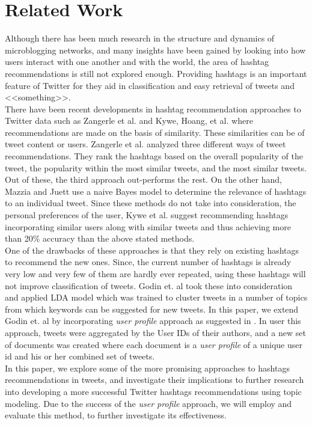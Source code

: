 \documentclass{acm_proc_article-sp}
\begin{document}
\section{Related Work}
\hspace*{5mm}Although there has been much research in the structure and dynamics of microblogging networks, and many insights have been gained by looking into how users interact with one another and with the world, the area of hashtag recommendations is still not explored enough. Providing hashtags is an important feature of Twitter for they aid in classification and easy retrieval of tweets and <<something>>.\\
\hspace*{5mm}There have been recent developments in hashtag recommendation approaches to Twitter data such as Zangerle et al. \cite{zangerle2011recommending} and Kywe, Hoang, et al.\cite{kywe2012recommending} where recommendations are made on the basis of similarity. These similarities can be of tweet content or users. Zangerle et al. \cite{zangerle2011recommending} analyzed three different ways of tweet recommendations. They rank the hashtags based on the overall popularity of the tweet, the popularity within the most similar tweets, and the most similar tweets. Out of these, the third approach out-performs the rest. On the other hand, Mazzia and Juett \cite{mazzia2009suggesting} use a naive Bayes model to determine the relevance of hashtags to an individual tweet. Since these methods do not take into consideration, the personal preferences of the user, Kywe et al. \cite{kywe2012recommending} suggest recommending hashtags incorporating similar users along with similar tweets and thus achieving more than 20\% accuracy than the above stated methods.\\
\hspace*{5mm}One of the drawbacks of these approaches is that they rely on existing hashtags to recommend the new ones. Since, the current number of hashtags is already very low and very few of them are hardly ever repeated, using these hashtags will not improve classification of tweets.  \cite{godin2013using} Godin et. al took these into consideration and applied LDA model which was trained to cluster tweets in a number of topics from which keywords can be suggested for new tweets. In this paper, we extend Godin et. al \cite{godin2013using} by incorporating \textit{user profile} approach as suggested in \cite{hong2010empirical} . In user this approach, tweets were aggregated by the User IDs of their authors, and a new set of documents was created where each document is a \textit{user profile} of a unique user id and his or her combined set of tweets.\\
\hspace*{5mm}In this paper, we explore some of the more promising approaches to hashtags recommendations in tweets, and investigate their implications to further research into developing a more successful Twitter hashtags recommendations using topic modeling. Due to the success of the \textit{user profile} approach, we will employ and evaluate this method, to further investigate its effectiveness.\\
\end{document}
